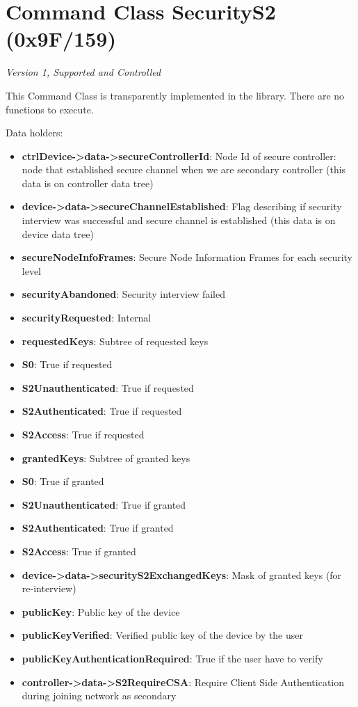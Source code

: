 \section{Command Class SecurityS2 (0x9F/159)}

\textit{Version 1, Supported and Controlled}
\newline

This Command Class is transparently implemented in the library. There are no functions to execute.
\newline

\noindent
Data holders:

\begin{itemize}
\item \textbf{ctrlDevice->data->secureControllerId}: Node Id of secure controller: node that established secure channel when we are secondary controller (this data is on controller data tree)
\item \textbf{device->data->secureChannelEstablished}: Flag describing if security interview was successful and secure channel is established (this data is on device data tree)
\item \textbf{secureNodeInfoFrames}: Secure Node Information Frames for each security level
\item \textbf{securityAbandoned}: Security interview failed
\item \textbf{securityRequested}: Internal
\item \textbf{requestedKeys}: Subtree of requested keys
\item \qquad\textbf{S0}: True if requested
\item \qquad\textbf{S2Unauthenticated}: True if requested
\item \qquad\textbf{S2Authenticated}: True if requested
\item \qquad\textbf{S2Access}: True if requested
\item \textbf{grantedKeys}: Subtree of granted keys
\item \qquad\textbf{S0}: True if granted
\item \qquad\textbf{S2Unauthenticated}: True if granted
\item \qquad\textbf{S2Authenticated}: True if granted
\item \qquad\textbf{S2Access}: True if granted
\item \textbf{device->data->securityS2ExchangedKeys}: Mask of granted keys (for re-interview)
\item \textbf{publicKey}: Public key of the device
\item \textbf{publicKeyVerified}: Verified public key of the device by the user
\item \textbf{publicKeyAuthenticationRequired}: True if the user have to verify
\item \textbf{controller->data->S2RequireCSA}: Require Client Side Authentication during joining network as secondary
\end{itemize}

